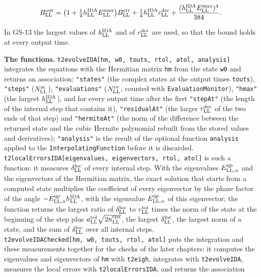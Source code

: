 \documentclass[
  10pt,
]{article}
\begin{document}
\[B^{\rm out}_{\rm LL}=\big(1+\tfrac14h^{\rm IDA}_{\rm LL}E^{\rm max}_{\rm LL}\big)B^{\rm err}_{\rm LL}+\tfrac14h^{\rm IDA}_{\rm LL}r^{\rm der}_{\rm LL}+\frac{(h^{\rm IDA}_{\rm LL}E^{\rm max}_{\rm LL})^4}{384}.\]

In GS-13 the largest values of \(h^{\rm IDA}_{\rm LL}\) and of
\(r^{\rm der}_{\rm LL}\) are used, so that the bound holds at every
output time.

\textbf{The functions.}
\texttt{t2evolveIDA{[}hm,\ w0,\ touts,\ rtol,\ atol,\ analysis{]}}
integrates the equations with the Hermitian matrix \texttt{hm} from the
state \texttt{w0} and returns an association: \texttt{"states"} (the
complex states at the output times \texttt{touts}), \texttt{"steps"}
(\(N^{\rm st}_{\rm LL}\)), \texttt{"evaluations"}
(\(N^{\rm ev}_{\rm LL}\), counted with \texttt{EvaluationMonitor}),
\texttt{"hmax"} (the largest \(h^{\rm IDA}_{\rm LL}\)), and for every
output time after the first \texttt{"stepAt"} (the length of the
internal step that contains it), \texttt{"residualAt"} (the larger
\(r^{\rm der}_{\rm LL}\) of the two ends of that step) and
\texttt{"hermiteAt"} (the norm of the difference between the returned
state and the cubic Hermite polynomial rebuilt from the stored values
and derivatives); \texttt{"analysis"} is the result of the optional
function \texttt{analysis} applied to the \texttt{InterpolatingFunction}
before it is discarded.
\texttt{t2localErrorsIDA{[}eigenvalues,\ eigenvectors,\ rtol,\ atol{]}}
is such a function: it measures \(\delta^{\rm loc}_{\rm LL}\) of every
internal step. With the eigenvalues \(E^{\rm qp}_{{\rm LL},n}\) and the
eigenvectors of the Hermitian matrix, the exact solution that starts
from a computed state multiplies the coefficient of every eigenvector by
the phase factor of the angle
\(-E^{\rm qp}_{{\rm LL},n}h^{\rm IDA}_{\rm LL}\), with the eigenvalue
\(E^{\rm qp}_{{\rm LL},n}\) of this eigenvector; the function returns
the largest ratio of \(\delta^{\rm loc}_{\rm LL}\) to
\(r^{\rm tol}_{\rm LL}\) times the norm of the state at the beginning of
the step plus \(a^{\rm tol}_{\rm LL}\sqrt{2n^{\rm cpx}_{\rm LL}}\), the
largest \(\delta^{\rm loc}_{\rm LL}\), the largest norm of a state, and
the sum of \(\delta^{\rm loc}_{\rm LL}\) over all internal steps.
\texttt{t2evolveIDAChecked{[}hm,\ w0,\ touts,\ rtol,\ atol{]}} puts the
integration and these measurements together for the checks of the later
chapters: it computes the eigenvalues and eigenvectors of \texttt{hm}
with \texttt{t2eigh}, integrates with \texttt{t2evolveIDA}, measures the
local errors with \texttt{t2localErrorsIDA}, and returns the association
\end{document}
